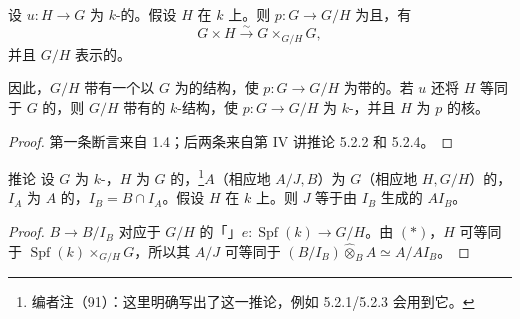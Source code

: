 \begin{SGAresult}{}{}
设 $u:H\to G$ 为 $k$-的。假设 $H$ 在 $k$ 上。则 $p:G\to G/H$ 为且，有
\[
G\times H\xrightarrow{\sim}G\times_{G/H}G,\tag{*}
\]
并且 $G/H$ 表示的。

因此，$G/H$ 带有一个以 $G$ 为的结构，使 $p:G\to G/H$ 为带的。若 $u$ 还将 $H$ 等同于 $G$ 的，则 $G/H$ 带有的 $k$-结构，使 $p:G\to G/H$ 为 $k$-，并且 $H$ 为 $p$ 的核。
\end{SGAresult}
\begin{proof}
第一条断言来自 1.4；后两条来自第 IV 讲推论 5.2.2 和 5.2.4。
\end{proof}
\begin{SGAresult}{推论}{}
设 $G$ 为 $k$-，$H$ 为 $G$ 的，\footnote{编者注（91）：这里明确写出了这一推论，例如 5.2.1/5.2.3 会用到它。}$A$（相应地 $A/J,B$）为 $G$（相应地 $H,G/H$）的，$I_A$ 为 $A$ 的，$I_B=B\cap I_A$。假设 $H$ 在 $k$ 上。则 $J$ 等于由 $I_B$ 生成的 $AI_B$。
\end{SGAresult}
\begin{proof}
 $B\to B/I_B$ 对应于 $G/H$ 的「」$e:\operatorname{Spf}(k)\to G/H$。由 $(*)$，$H$ 可等同于 $\operatorname{Spf}(k)\times_{G/H}G$，所以其 $A/J$ 可等同于 $(B/I_B)\widehat\otimes_B A\simeq A/AI_B$。
\end{proof}

